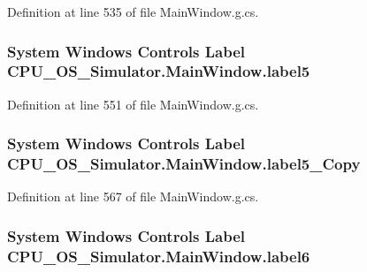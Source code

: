 Definition at line 535 of file Main\+Window.\+g.\+cs.

\hypertarget{class_c_p_u___o_s___simulator_1_1_main_window_a37b18e7542e985a8984375d0b1cf441e}{}
\subsubsection[{label5}]{\setlength{\rightskip}{0pt plus 5cm}System Windows Controls Label C\+P\+U\+\_\+\+O\+S\+\_\+\+Simulator.\+Main\+Window.\+label5\hspace{0.3cm}{\ttfamily [package]}}\label{class_c_p_u___o_s___simulator_1_1_main_window_a37b18e7542e985a8984375d0b1cf441e}


Definition at line 551 of file Main\+Window.\+g.\+cs.

\hypertarget{class_c_p_u___o_s___simulator_1_1_main_window_aadfe7782d7e25b730849222805a541f9}{}
\subsubsection[{label5\+\_\+\+Copy}]{\setlength{\rightskip}{0pt plus 5cm}System Windows Controls Label C\+P\+U\+\_\+\+O\+S\+\_\+\+Simulator.\+Main\+Window.\+label5\+\_\+\+Copy\hspace{0.3cm}{\ttfamily [package]}}\label{class_c_p_u___o_s___simulator_1_1_main_window_aadfe7782d7e25b730849222805a541f9}


Definition at line 567 of file Main\+Window.\+g.\+cs.

\hypertarget{class_c_p_u___o_s___simulator_1_1_main_window_a8f210008776bb163b4c2c2b160aa52be}{}
\subsubsection[{label6}]{\setlength{\rightskip}{0pt plus 5cm}System Windows Controls Label C\+P\+U\+\_\+\+O\+S\+\_\+\+Simulator.\+Main\+Window.\+label6\hspace{0.3cm}{\ttfamily [package]}}\label{class_c_p_u___o_s___simulator_1_1_main_window_a8f210008776bb163b4c2c2b160aa52be}


